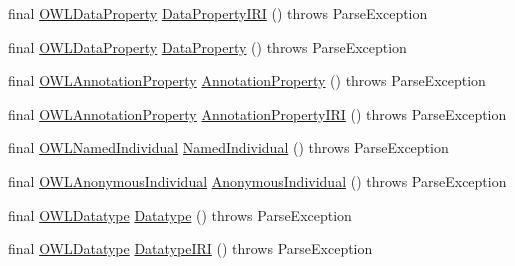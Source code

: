 \begin{DoxyCompactItemize}
\item 
final \hyperlink{interfaceorg_1_1semanticweb_1_1owlapi_1_1model_1_1_o_w_l_data_property}{O\-W\-L\-Data\-Property} \hyperlink{classorg_1_1coode_1_1owlapi_1_1functionalparser_1_1_o_w_l_functional_syntax_parser_ac8c52c963edd348bbe3ae58b5f0b8a33}{Data\-Property\-I\-R\-I} ()  throws Parse\-Exception 
\item 
final \hyperlink{interfaceorg_1_1semanticweb_1_1owlapi_1_1model_1_1_o_w_l_data_property}{O\-W\-L\-Data\-Property} \hyperlink{classorg_1_1coode_1_1owlapi_1_1functionalparser_1_1_o_w_l_functional_syntax_parser_a73db6760e25cf2a16c69de29a272a107}{Data\-Property} ()  throws Parse\-Exception 
\item 
final \hyperlink{interfaceorg_1_1semanticweb_1_1owlapi_1_1model_1_1_o_w_l_annotation_property}{O\-W\-L\-Annotation\-Property} \hyperlink{classorg_1_1coode_1_1owlapi_1_1functionalparser_1_1_o_w_l_functional_syntax_parser_a6e457a4e967997c9b552d98453b50153}{Annotation\-Property} ()  throws Parse\-Exception 
\item 
final \hyperlink{interfaceorg_1_1semanticweb_1_1owlapi_1_1model_1_1_o_w_l_annotation_property}{O\-W\-L\-Annotation\-Property} \hyperlink{classorg_1_1coode_1_1owlapi_1_1functionalparser_1_1_o_w_l_functional_syntax_parser_aae7dfa4536e26247689922205775adcd}{Annotation\-Property\-I\-R\-I} ()  throws Parse\-Exception 
\item 
final \hyperlink{interfaceorg_1_1semanticweb_1_1owlapi_1_1model_1_1_o_w_l_named_individual}{O\-W\-L\-Named\-Individual} \hyperlink{classorg_1_1coode_1_1owlapi_1_1functionalparser_1_1_o_w_l_functional_syntax_parser_ae54b3fd802b264cf6ff7dfca9bd5d879}{Named\-Individual} ()  throws Parse\-Exception 
\item 
final \hyperlink{interfaceorg_1_1semanticweb_1_1owlapi_1_1model_1_1_o_w_l_anonymous_individual}{O\-W\-L\-Anonymous\-Individual} \hyperlink{classorg_1_1coode_1_1owlapi_1_1functionalparser_1_1_o_w_l_functional_syntax_parser_a283065aa193ac48b4b93f4b8d85fce97}{Anonymous\-Individual} ()  throws Parse\-Exception 
\item 
final \hyperlink{interfaceorg_1_1semanticweb_1_1owlapi_1_1model_1_1_o_w_l_datatype}{O\-W\-L\-Datatype} \hyperlink{classorg_1_1coode_1_1owlapi_1_1functionalparser_1_1_o_w_l_functional_syntax_parser_a3cc468cae2e538c2263a18d644ecbd8a}{Datatype} ()  throws Parse\-Exception 
\item 
final \hyperlink{interfaceorg_1_1semanticweb_1_1owlapi_1_1model_1_1_o_w_l_datatype}{O\-W\-L\-Datatype} \hyperlink{classorg_1_1coode_1_1owlapi_1_1functionalparser_1_1_o_w_l_functional_syntax_parser_a88c1eacdd2173cd88019a19d978edff5}{Datatype\-I\-R\-I} ()  throws Parse\-Exception 

\end{DoxyCompactItemize}
